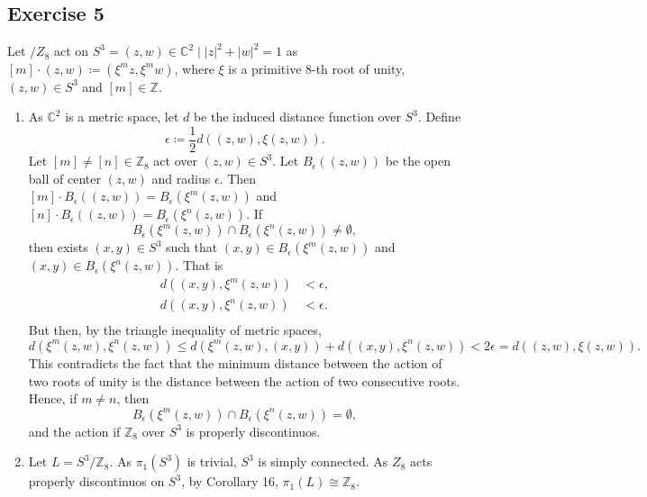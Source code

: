 \documentclass[11pt,a4paper]{article}
\newcommand{\Z}{\mathbb Z}
\newcommand{\C}{\mathbb C}
\begin{document}
\subsection*{Exercise 5}
  Let $ /Z_8 $ act on $ S^3 = {(z,w) \in \C^2 \mid |z|^2 + |w|^2 = 1}$ as $ [m] \cdot (z, w) \coloneq (\xi^m z, \xi^m w) $, where $ \xi $ is a primitive 8-th root of unity, $ (z, w) \in S^3 $ and $ [m] \in \Z $.
  
  \begin{enumerate}[label=\alph*)]
    \item As $ \C^2 $ is a metric space, let $ d $ be the induced distance function over $ S^3 $. Define
    $$
      \epsilon \coloneq \frac{1}{2} d((z, w), \xi(z, w)).
    $$
    Let $ [m] \neq [n] \in \Z_8 $ act over $ (z, w) \in S^3 $. Let $ B_\epsilon((z, w)) $ be the open ball of center $ (z, w) $  and radius $ \epsilon $. Then $ [m] \cdot  B_\epsilon((z, w)) = B_\epsilon(\xi^m(z, w))$ and $ [n] \cdot  B_\epsilon((z, w)) = B_\epsilon(\xi^n(z, w))$. If
    $$
      B_\epsilon(\xi^m(z, w)) \cap B_\epsilon(\xi^n(z, w)) \neq \emptyset,
    $$
    then exists $ (x, y) \in S^3 $ such that $ (x, y) \in B_\epsilon(\xi^m(z, w)) $ and $ (x, y) \in B_\epsilon(\xi^n(z, w)) $. That is
    \begin{align*}
      d((x, y), \xi^m(z, w)) & < \epsilon, \\
      d((x, y), \xi^n(z, w)) & < \epsilon. \\
    \end{align*}
    But then, by the triangle inequality of metric spaces,
    $$
      d(\xi^m(z, w), \xi^n(z, w)) \leq d(\xi^m(z, w), (x, y)) + d((x, y), \xi^n(z, w)) < 2 \epsilon = d((z, w), \xi(z, w)).
    $$
    This contradicts the fact that the minimum distance between the action of two roots of unity is the distance between the action of two consecutive roots. Hence, if $ m \neq n $, then 
    $$
      B_\epsilon(\xi^m(z, w)) \cap B_\epsilon(\xi^n(z, w)) = \emptyset,
    $$
    and the action if $ \Z_8 $ over $ S^3 $ is properly discontinuos.

    \item Let $ L = S^3 / \Z_8 $. As $ \pi_1(S^3) $ is trivial, $ S^3 $ is simply connected. As $ Z_8 $ acts properly discontinuos on $ S^3$, by Corollary 16, $ \pi_1(L) \cong \Z_8 $.
    

\end{enumerate}
\end{document}
